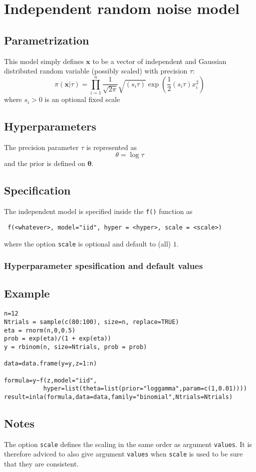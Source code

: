 \documentclass[a4paper,11pt]{article}
\begin{document}
\section*{Independent random noise model}

\subsection*{Parametrization}

This model simply defines $\mathbf{x}$ to be a vector of independent
and Gaussian distributed random variable (possibly scaled) with
precision $\tau$:
\begin{displaymath}
    \pi(\mathbf{x}|\tau) = \prod_{i=1}^{n} \frac{1}{\sqrt{2\pi}}
    \sqrt{(s_{i}\tau)}\exp\left(\frac{1}{2} (s_{i}\tau) x_{i}^{2}\right)
\end{displaymath}
where $s_{i} > 0$ is an optional fixed scale

\subsection*{Hyperparameters}

The precision parameter $\tau$ is represented as
\begin{displaymath}
    \theta =\log \tau
\end{displaymath}
and the prior is defined on $\mathbf{\theta}$.

\subsection*{Specification}

The independent model is specified inside the {\tt f()} function as
\begin{verbatim}
 f(<whatever>, model="iid", hyper = <hyper>, scale = <scale>)
\end{verbatim}
where the option \verb|scale| is optional and default to (all) $1$.

\subsubsection*{Hyperparameter spesification and default values}


\subsection*{Example}

\begin{verbatim}
n=12
Ntrials = sample(c(80:100), size=n, replace=TRUE)
eta = rnorm(n,0,0.5)
prob = exp(eta)/(1 + exp(eta))
y = rbinom(n, size=Ntrials, prob = prob)

data=data.frame(y=y,z=1:n)

formula=y~f(z,model="iid",
           hyper=list(theta=list(prior="loggamma",param=c(1,0.01))))
result=inla(formula,data=data,family="binomial",Ntrials=Ntrials)
\end{verbatim}


\subsection*{Notes}

The option \verb|scale| defines the scaling in the same order as
argument \verb|values|.  It is therefore adviced to also give argument
\verb|values| when \verb|scale| is used to be sure that they are
consistent.
\end{document}
